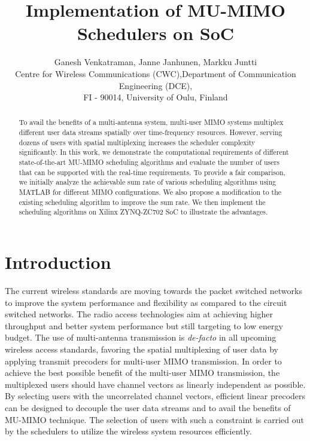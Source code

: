 \documentclass[conference,letterpaper,10pt]{./../../IEEE/IEEEtran}
\begin{document}
\title{Implementation of MU-MIMO Schedulers on SoC}

\author{\begin{tabular}{cc}
\multicolumn{2}{c}{Ganesh Venkatraman, Janne Janhunen, Markku Juntti}\\
Centre for Wireless Communications (CWC), & Department of Communication Engineering (DCE), \\
\multicolumn{2}{c}{FI - 90014, University of Oulu, Finland}\\
\end{tabular}}

\maketitle

\begin{abstract}
To avail the benefits of a multi-antenna system, multi-user \ac{MIMO} systems multiplex different user data streams spatially over time-frequency resources. However, serving dozens of users with spatial multiplexing increases the scheduler complexity significantly. In this work, we demonstrate the computational requirements of different state-of-the-art MU-MIMO scheduling algorithms and evaluate the number of users that can be supported with the real-time requirements. To provide a fair comparison, we initially analyze the achievable sum rate of various scheduling algorithms using MATLAB for different MIMO configurations. We also propose a modification to the existing scheduling algorithm to improve the sum rate. We then implement the scheduling algorithms on Xilinx ZYNQ-ZC702 \ac{SoC} to illustrate the advantages.
\end{abstract}

\acresetall
\section{Introduction}
The current wireless standards are moving towards the packet switched networks to improve the system performance and flexibility as compared to the circuit switched networks. The radio access technologies aim at achieving higher throughput and better system performance but still targeting to low energy budget. The use of multi-antenna transmission is \textit{de-facto} in all upcoming wireless access standards, favoring the spatial multiplexing of user data by applying transmit precoders for multi-user \ac{MIMO} transmission. In order to achieve the best possible benefit of the multi-user \ac{MIMO} transmission, the multiplexed users should have channel vectors as linearly independent as possible. 
By selecting users with the uncorrelated channel vectors, efficient linear precoders can be designed to decouple the user data streams and to avail the benefits of MU-MIMO technique. The selection of users with such a constraint is carried out by the schedulers to utilize the wireless system resources efficiently.
\end{document}
